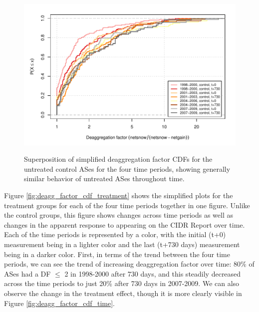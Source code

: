 \begin{figure}[H]
\begin{centering}
\begin{singlespace}
    \includegraphics[width=6in]{figures/behavior-deagg_factor-all-special_c.pdf}
    \vspace{-2em}\\
    \caption{Superposition of simplified deaggregation factor CDFs for the
    untreated control ASes for the four time periods, showing generally similar
    behavior of untreated ASes throughout time.}
    \label{fig:deagg_factor_cdf_control}
\end{singlespace}
\end{centering}
\end{figure}

Figure \ref{fig:deagg_factor_cdf_treatment} shows the simplified plots for the
treatment groups for each of the four time periods together in one figure.
Unlike the control groups, this figure shows changes across time periods as
well as changes in the apparent response to appearing on the CIDR Report over
time. Each of the time periods is represented by a color, with the initial
(t+0) measurement being in a lighter color and the last (t+730 days)
measurement being in a darker color. First, in terms of the trend between the
four time periods, we can see the trend of increasing deaggregation factor over
time: 80\% of ASes had a DF $\le$ 2 in 1998-2000 after 730 days, and this
steadily decreased across the time periods to just 20\% after 730 days in
2007-2009. We can also observe the change in the treatment effect, though it is
more clearly visible in Figure \ref{fig:deagg_factor_cdf_time}.

